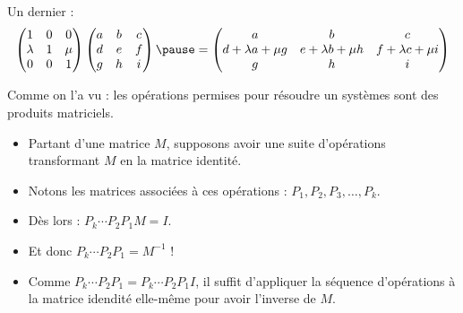 \begin{frame}
  Un dernier :
  \begin{equation*}
    \begin{pmatrix}
      1       & 0 & 0   \\
      \lambda & 1 & \mu \\
      0 & 0 & 1
    \end{pmatrix}
    \begin{pmatrix}
      a       & b & c   \\
      d       & e & f   \\
      g & h & i
    \end{pmatrix}\pause
    =
    \begin{pmatrix}
      a & b & c\\
      d + \lambda a + \mu g & e + \lambda b + \mu h & f + \lambda c + \mu i\\
      g & h &i
    \end{pmatrix}
  \end{equation*}
\end{frame}
\begin{frame}
  \begin{remark}
    Comme on l'a vu : les opérations permises pour résoudre un systèmes sont des produits matriciels.
  \end{remark}\pause{}
  \begin{itemize}
  \item Partant d'une matrice \(M\),\pause{} supposons avoir une suite d'opérations transformant \(M\) en la matrice identité.\pause{}

  \item Notons les matrices associées à ces opérations : \(P_{1}, P_{2}, P_{3}, \ldots, P_{k}\).\pause{}

  \item Dès lors : \(P_{k} \cdots P_{2}P_{1}M = I\).\pause{}

  \item Et donc \(P_{k} \cdots P_{2}P_{1} = M^{-1}\) !\pause{}

  \item Comme \(P_{k} \cdots P_{2}P_{1} = P_{k} \cdots P_{2}P_{1} I\),\pause{} il suffit d'appliquer la séquence d'opérations à la matrice idendité elle-même pour avoir l'inverse de \(M\).
  \end{itemize}
\end{frame}

